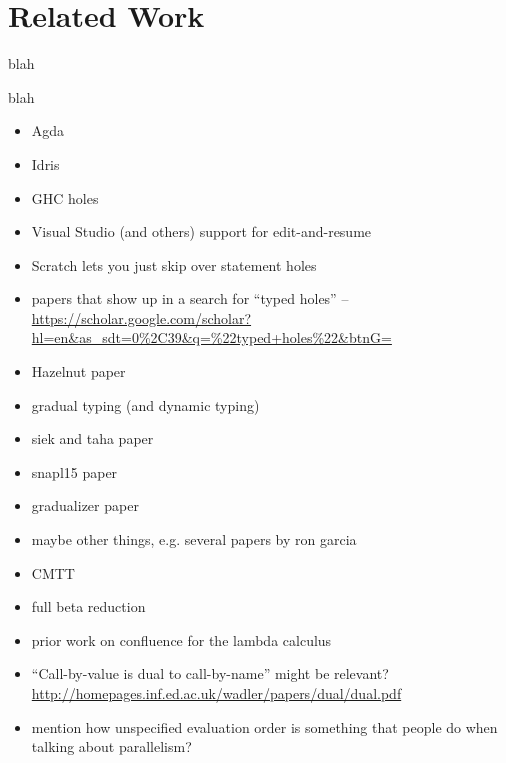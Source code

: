 \newcommand{\relatedWorkSection}{Related Work}
\section{\protect\relatedWorkSection} %
\label{sec:relatedWork}

blah

blah


\begin{itemize}
	\item Agda
	\item Idris
	\item GHC holes
	\item Visual Studio (and others) support for edit-and-resume
	\item Scratch lets you just skip over statement holes
	\item papers that show up in a search for ``typed holes'' -- \url{https://scholar.google.com/scholar?hl=en&as_sdt=0%2C39&q=%22typed+holes%22&btnG=}
\end{itemize}


\begin{itemize}
	\item Hazelnut paper
\end{itemize}


\begin{itemize}
	\item gradual typing (and dynamic typing)
  \item siek and taha paper
  \item snapl15 paper
  \item gradualizer paper
  \item maybe other things, e.g. several papers by ron garcia
\end{itemize}


\begin{itemize}
	\item CMTT
\end{itemize}


\begin{itemize}
	\item full beta reduction
	\item prior work on confluence for the lambda calculus
	\item ``Call-by-value is dual to call-by-name'' might be relevant? \url{http://homepages.inf.ed.ac.uk/wadler/papers/dual/dual.pdf}
	\item mention how unspecified evaluation order is something that people do when talking about parallelism?
\end{itemize}

